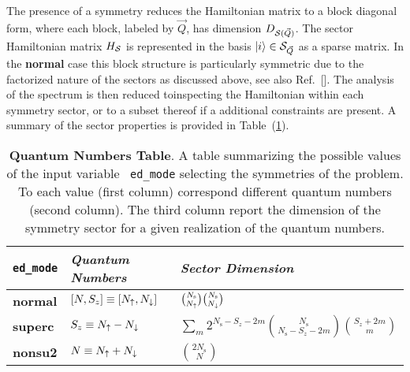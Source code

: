 \documentclass[edipack2.tex]{subfiles}
\begin{document}
The presence of a symmetry reduces the Hamiltonian matrix to
a block diagonal form, where each block, labeled by $\vec{Q}$, has dimension
$D_{{\cal S}(\vec{Q})}$. The sector Hamiltonian matrix $H_{\cal S}$ is represented in the
basis $|i\rangle\in{\cal S}_{\vec{Q}}$ as a sparse matrix.
In the {\bf normal} case this block structure is particularly
symmetric due to the factorized nature of the sectors as discussed
above, see also Ref.~[].
The analysis of the spectrum is then reduced toinspecting the
Hamiltonian within each symmetry sector, or to a subset thereof if a
additional constraints are present.
A summary of the sector properties is provided in
Table~(\ref{TabSector}). 
\begin{table}%
  \label{TabSector}
\begin{center}
\begin{tabularx}{\linewidth}{ |X|X|X| } 
 \hline
  {\tt ed\_mode} & {\it Quantum Numbers} & {\it Sector Dimension} \\
  \hline
  {\bf normal} & $[N,S_z]\equiv[N_\uparrow,N_\downarrow]$ &
                                                $\binom{N_\mathrm{s}}{N_\uparrow}\binom{N_\mathrm{s}}{N_\downarrow}$
  \\
  \hline
  {\bf superc} & $S_z\equiv N_\uparrow-N_\downarrow$ &  $\sum_m 2^{N_\mathrm{s}-S_z-2m}\binom{N_\mathrm{s}}{N_\mathrm{s}-S_z-2m}\binom{S_z+2m}{m}$
  \\
  \hline
  {\bf nonsu2} & $N \equiv N_\uparrow+N_\downarrow$ & $\binom{2N_\mathrm{s}}{N}$ \\ 
 \hline
\end{tabularx}
\end{center}
\caption{
  {\bf Quantum Numbers Table}.
A table summarizing the possible values of the input variable {\tt
  ed\_mode} selecting the symmetries of the problem. To each value
(first column) correspond different quantum numbers (second column).
The third column report the dimension of the symmetry sector for a
given realization of the quantum numbers.}
\end{table}

\end{document}

